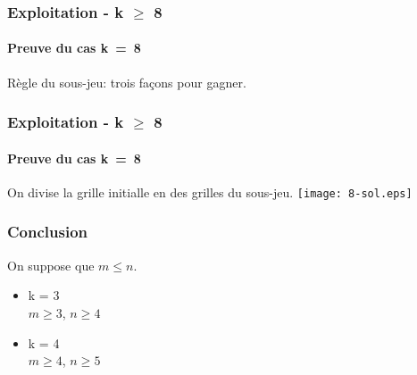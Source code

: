 \documentclass{beamer}
\begin{document}
\begin{frame}
    \frametitle{Exploitation - k $\ge$ 8}
    \framesubtitle{Preuve du cas k~=~8}
    Règle du sous-jeu: trois façons pour gagner.
    \begin{itemize}
        \begin{center}
        \end{center}
\end{itemize}
\end{frame}

\begin{frame}
    \frametitle{Exploitation - k $\ge$ 8}
    \framesubtitle{Preuve du cas k~=~8}
    On divise la grille initialle en des grilles du sous-jeu. 
    \texttt{[image: 8-sol.eps]}
    
\end{frame}

\begin{frame}
    \frametitle{Conclusion}
On suppose que $m \le n$.\\
\begin{itemize}
    \item<3-> k = 3\\
        $m \ge 3$, $n \ge 4$
    \item<4-> k = 4\\
        $m \ge 4$, $n \ge 5$
\end{itemize}
\end{frame}
\end{document}
